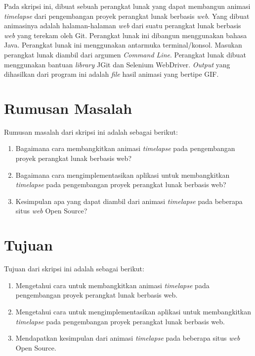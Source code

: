 Pada skripsi ini, dibuat sebuah perangkat lunak yang dapat membangun animasi \textit{timelapse} dari pengembangan proyek perangkat lunak berbasis \textit{web}. Yang dibuat animasinya adalah halaman-halaman  \textit{web} dari suatu perangkat lunak berbasis \textit{web} yang terekam oleh Git. Perangkat lunak ini dibangun menggunakan bahasa Java. Perangkat lunak ini menggunakan antarmuka terminal/konsol. Masukan perangkat lunak diambil dari argumen \textit{Command Line}. Perangkat lunak dibuat menggunakan bantuan \textit{library} JGit dan Selenium WebDriver. \textit{Output} yang dihasilkan dari program ini adalah \textit{file} hasil animasi yang bertipe GIF.

\section{Rumusan Masalah}
\label{sec:rumusan}
Rumusan masalah dari skripsi ini adalah sebagai berikut:
\begin{enumerate}
	\item Bagaimana cara membangkitkan animasi \textit{timelapse} pada pengembangan proyek perangkat lunak berbasis web?
	\item Bagaimana cara mengimplementasikan aplikasi untuk membangkitkan \textit{timelapse} pada pengembangan proyek perangkat lunak berbasis web?
	\item Kesimpulan apa yang dapat diambil dari animasi \textit{timelapse} pada beberapa situs \textit{web} Open Source?	
\end{enumerate}

\section{Tujuan}
\label{sec:tujuan}
Tujuan dari skripsi ini adalah sebagai berikut:
\begin{enumerate}
	\item Mengetahui cara untuk membangkitkan animasi \textit{timelapse} pada pengembangan proyek perangkat lunak berbasis web.
	\item Mengetahui cara untuk mengimplementasikan aplikasi untuk membangkitkan \textit{timelapse} pada pengembangan proyek perangkat lunak berbasis web.
	\item Mendapatkan kesimpulan dari animasi \textit{timelapse} pada beberapa situs \textit{web} Open Source.
\end{enumerate}
	

